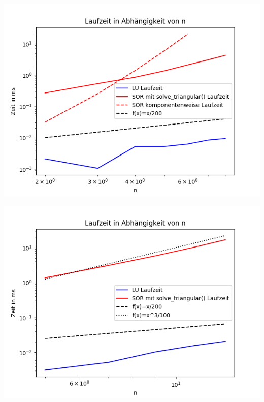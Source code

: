\documentclass[smallheadings]{scrartcl}
\theoremstyle{definition}
\begin{document}
\begin{minipage}{\textwidth}

 \centering
 \includegraphics[scale = 0.9]{Time2_1}
 	\label{time}

 \end{minipage}
 
\begin{minipage}{\textwidth}

 \centering
 \includegraphics[scale = 0.9]{Time2_2}
 	\label{time2}

 \end{minipage}
\end{document}
